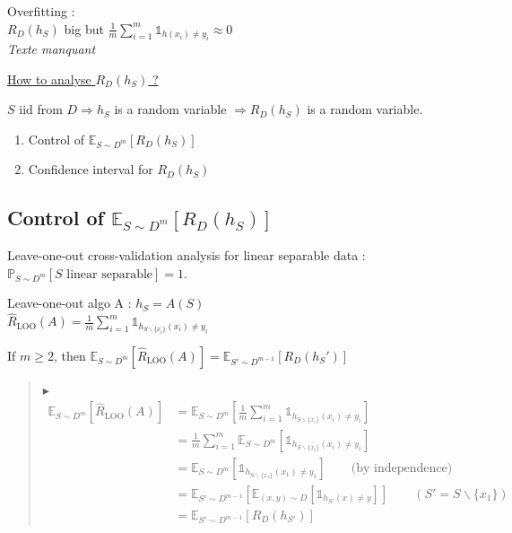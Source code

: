 \documentclass[12pt,a4paper]{article}
\newcommand{\propriete}[2]{%
    \begin{tcolorbox}[colback=white,colframe=green!25!white,title=\textbf{Propriété #1}, coltitle=black]
        #2
    \end{tcolorbox}
}
\newcommand{\preuve}[1]{%
    \begin{quote}
        $\blacktriangleright$~#1
    \end{quote}
}
\begin{document}
Overfitting :\\
$R_D(h_S)$ big but $\frac{1}{m} \sum_{i = 1}^m \mathds{1}_{h(x_i) \neq y_i} \approx 0$\\


\textit{Texte manquant}


\underline{How to analyse $R_D(h_S)$ ?}

$S$ iid from $D \Rightarrow h_S$ is a random variable $\Rightarrow R_D(h_S)$ is a random variable.

\begin{enumerate}
    \item Control of $\mathbb{E}_{S \sim D^m} [R_D(h_S)]$
    \item Confidence interval for $R_D(h_S)$\\
\end{enumerate}

\subsection{Control of $\mathbb{E}_{S \sim D^m} [R_D(h_S)]$}

Leave-one-out cross-validation analysis for linear separable data :\\
$\mathbb{P}_{S \sim D^m} [S \text{ linear separable}] = 1$.

Leave-one-out algo A : $h_S = A(S)$\\

$\hat{R}_{\text{LOO}}(A) = \frac{1}{m} \sum_{i = 1}^m \mathds{1}_{h_{S \backslash \{x_i\}}(x_i) \neq y_i}$\\

\propriete{}{
    If $m \geq 2$, then $\mathbb{E}_{S \sim D^m} [\hat{R}_{\text{LOO}}(A)] = \mathbb{E}_{S' \sim D^{m - 1}} [R_D(h_S')]$
}

\preuve{
    \vspace{-\baselineskip}
    \vspace{-\baselineskip}
    \begin{align*}
        \mathbb{E}_{S \sim D^m} [\hat{R}_{\text{LOO}}(A)] &= \mathbb{E}_{S \sim D^m} \left[\frac{1}{m} \sum_{i = 1}^m \mathds{1}_{h_{S \backslash \{x_i\}}(x_i) \neq y_i}\right] \\
        &= \frac{1}{m} \sum_{i = 1}^m \mathbb{E}_{S \sim D^m} [\mathds{1}_{h_{S \backslash \{x_i\}}(x_i) \neq y_i}] \\
        &= \mathbb{E}_{S \sim D^m} [\mathds{1}_{h_{S \backslash \{x_1\}}(x_1) \neq y_1}] \qquad \text{(by independence)} \\
        &= \mathbb{E}_{S' \sim D^{m - 1}} [\mathbb{E}_{(x, y) \sim D} [\mathds{1}_{h_{S'}(x) \neq y}]] \qquad (S' = S \backslash \{x_1\}) \\
        &= \mathbb{E}_{S' \sim D^{m - 1}} [R_D(h_{S'})]
    \end{align*}
}
\end{document}
